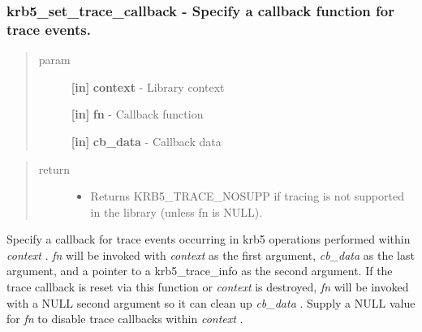 \documentclass[letterpaper,10pt,english]{sphinxmanual}
\begin{document}
\subsubsection{krb5\_set\_trace\_callback -  Specify a callback function for trace events.}
\label{appdev/refs/api/krb5_set_trace_callback:krb5-set-trace-callback-specify-a-callback-function-for-trace-events}\label{appdev/refs/api/krb5_set_trace_callback::doc}

\begin{fulllineitems}
\label{appdev/refs/api/krb5_set_trace_callback:c.krb5_set_trace_callback}
\end{fulllineitems}

\begin{quote}\begin{description}
\item[{param}] \leavevmode
\textbf{{[}in{]}} \textbf{context} - Library context

\textbf{{[}in{]}} \textbf{fn} - Callback function

\textbf{{[}in{]}} \textbf{cb\_data} - Callback data

\end{description}\end{quote}
\begin{quote}\begin{description}
\item[{return}] \leavevmode\begin{itemize}
\item {} 
Returns KRB5\_TRACE\_NOSUPP if tracing is not supported in the library (unless fn is NULL).

\end{itemize}

\end{description}\end{quote}

Specify a callback for trace events occurring in krb5 operations performed within \emph{context} . \emph{fn} will be invoked with \emph{context} as the first argument, \emph{cb\_data} as the last argument, and a pointer to a krb5\_trace\_info as the second argument. If the trace callback is reset via this function or \emph{context} is destroyed, \emph{fn} will be invoked with a NULL second argument so it can clean up \emph{cb\_data} . Supply a NULL value for \emph{fn} to disable trace callbacks within \emph{context} .
\end{document}
